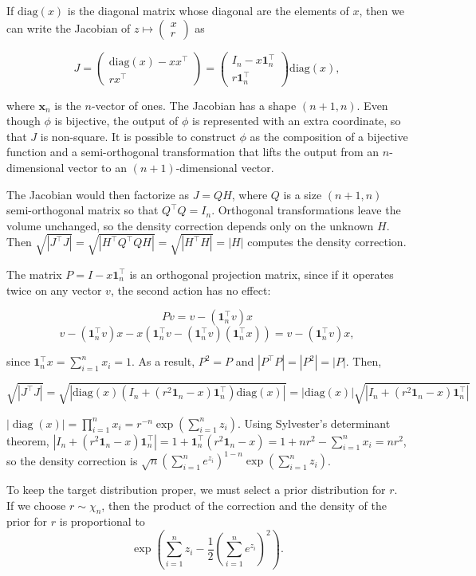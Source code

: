 \documentclass[twoside]{article}
\begin{document}
If $\mathrm{diag}(x)$ is the diagonal matrix whose diagonal are the elements of $x$, then we can write the Jacobian of $z \mapsto \begin{pmatrix}x \\ r \end{pmatrix}$ as

$$J = \begin{pmatrix}\mathrm{diag}(x) - x x^\top \\ r x^\top\end{pmatrix} = \begin{pmatrix}I_n - x \boldsymbol{1}_n^\top \\ r \boldsymbol{1}_n^\top \end{pmatrix} \mathrm{diag}(x),$$

where $\boldsymbol{x}_n$ is the $n$-vector of ones.
The Jacobian has a shape $(n+1,n)$.
Even though $\phi$ is bijective, the output of $\phi$ is represented with an extra coordinate, so that $J$ is non-square.
It is possible to construct $\phi$ as the composition of a bijective function and a semi-orthogonal transformation that lifts the output from an $n$-dimensional vector to an $(n+1)$-dimensional vector.

The Jacobian would then factorize as $J = Q H$, where $Q$ is a size $(n+1,n)$ semi-orthogonal matrix so that $Q^\top Q = I_n$.
Orthogonal transformations leave the volume unchanged, so the density correction depends only on the unknown $H$.
Then $\sqrt{|J^\top J|} = \sqrt{|H^\top Q^\top Q H|} = \sqrt{|H^\top H|} = |H|$ computes the density correction.

The matrix $P = I - x \boldsymbol{1}^\top_n$ is an orthogonal projection matrix, since if it operates twice on any vector $v$, the second action has no effect:

$$Pv = v - (\boldsymbol{1}^\top_n v) x$$
$$v - (\boldsymbol{1}^\top_n v) x - x (\boldsymbol{1}^\top_nv - (\boldsymbol{1}^\top_n v) (\boldsymbol{1}^\top_n x)) = v - (\boldsymbol{1}^\top_n v) x,$$

since $\boldsymbol{1}^\top_n x = \sum_{i=1}^n x_i = 1$.
As a result, $P^2 = P$ and $|P^\top P| = |P^2| = |P|$.
Then,

$$\sqrt{|J^\top J|} = \sqrt{|\mathrm{diag}(x)(I_n + (r^2 \boldsymbol{1}_n - x) \boldsymbol{1}_n^\top)\mathrm{diag}(x)|} = |\mathrm{diag}(x)|\sqrt{|I_n + (r^2 \boldsymbol{1}_n - x) \boldsymbol{1}_n^\top|}$$


$|\operatorname{diag}(x)| = \prod_{i=1}^n x_i = r^{-n} \exp (\sum_{i=1}^n z_i)$. 
Using Sylvester's determinant theorem, $|I_n + (r^2 \boldsymbol{1}_n - x) \boldsymbol{1}_n^\top| = 1 + \boldsymbol{1}_n^\top (r^2 \boldsymbol{1}_n - x) = 1 + n r^2 - \sum_{i=1}^n x_i = n r^2$, so the density correction is $\sqrt{n} (\sum_{i=1}^n e^{z_i})^{1-n} \exp(\sum_{i=1}^n z_i)$.

To keep the target distribution proper, we must select a prior distribution for $r$.
If we choose $r \sim \chi_n$, then the product of the correction and the density of the prior for $r$ is proportional to
$$\exp\left(\sum_{i=1}^n z_i - \frac{1}{2}(\sum_{i=1}^n e^{z_i})^2\right).$$

\vfill
\end{document}
